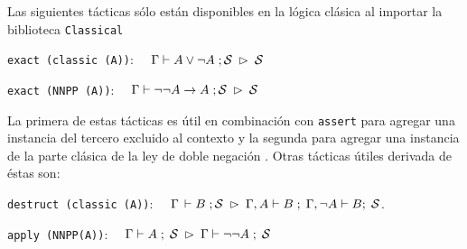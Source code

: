 \documentclass[11pt,letterpaper]{article}
\begin{document}
Las siguientes tácticas sólo están disponibles en la lógica clásica al importar 
la biblioteca \texttt{Classical}
\bi
 \item \texttt{exact (classic (A))}: 
  $\quad \Gamma\vdash A\lor\neg A\;;\mathcal{S} \;\rhd\;\mathcal{S}$
 \item \texttt{exact (NNPP (A))}: 
  $\quad \Gamma\vdash \neg\neg A\to A\;;\mathcal{S} \;\rhd\;\mathcal{S}$
\ei

La primera de estas tácticas es útil en combinación con \texttt{assert} para 
agregar una instancia del tercero excluido al contexto y la segunda para 
agregar una instancia de la parte clásica de la ley de doble negación . Otras 
tácticas útiles derivada de éstas son:
\bi
 \item \texttt{destruct (classic (A))}: 
  $\quad \Gamma\,\vdash B\;;\mathcal{S}\;\rhd\; \Gamma,A\vdash B\;;\;\Gamma,\neg A\vdash B;\;\mathcal{S}$.
 \item \texttt{apply (NNPP(A))}: 
  $\quad \Gamma\vdash A\;;\;\mathcal{S}\;\rhd\;\Gamma\vdash\neg\neg A\;;\;\mathcal{S}$
\ei






\end{document}
